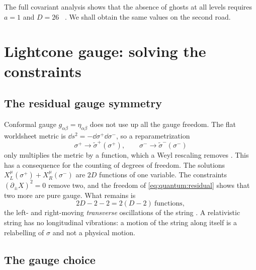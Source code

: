 The full covariant analysis shows that the absence of ghosts at all levels requires $a=1$
and $D=26$ \TL\ . We shall obtain the same values on the
second road.

\section{Lightcone gauge: solving the constraints}\label{sec:quantum:lightcone}

\subsection{The residual gauge symmetry}

Conformal gauge $g_{\alpha\beta}=\eta_{\alpha\beta}$ does not use up all the gauge freedom.
The flat worldsheet metric is $\dd s^2=-\dd\sigma^+\dd\sigma^-$, so a reparametrization
\begin{equation}\label{eq:quantum:residual}
 \sigma^+\to\tilde\sigma^+(\sigma^+),\qquad \sigma^-\to\tilde\sigma^-(\sigma^-)
\end{equation}
only multiplies the metric by a function, which a Weyl rescaling removes
. This has a consequence for the counting of degrees of
freedom. The solutions $X_L^\mu(\sigma^+)+X_R^\mu(\sigma^-)$ are $2D$ functions of one
variable. The constraints $(\partial_\pm X)^2=0$ remove two, and the freedom of
\cref{eq:quantum:residual} shows that two more are pure gauge. What remains is
\begin{equation}\label{eq:quantum:count}
 2D-2-2=2(D-2)\ \text{functions},
\end{equation}
the left- and right-moving \emph{transverse} oscillations of the string
. A relativistic string has no longitudinal vibrations: a
motion of the string along itself is a relabelling of $\sigma$ and not a physical motion.

\subsection{The gauge choice}

